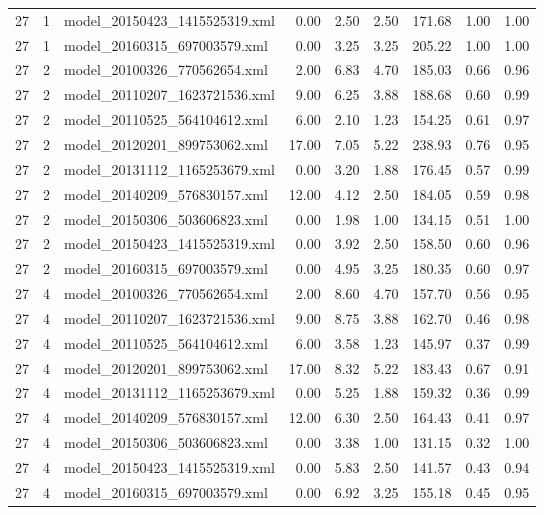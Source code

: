 \begin{table}[ht]
\begin{tabular}{rrlrrrrrr}
   27 &   1 & model\_20150423\_1415525319.xml & 0.00 & 2.50 & 2.50 & 171.68 & 1.00 & 1.00 \\ 
   27 &   1 & model\_20160315\_697003579.xml & 0.00 & 3.25 & 3.25 & 205.22 & 1.00 & 1.00 \\ 
   27 &   2 & model\_20100326\_770562654.xml & 2.00 & 6.83 & 4.70 & 185.03 & 0.66 & 0.96 \\ 
   27 &   2 & model\_20110207\_1623721536.xml & 9.00 & 6.25 & 3.88 & 188.68 & 0.60 & 0.99 \\ 
   27 &   2 & model\_20110525\_564104612.xml & 6.00 & 2.10 & 1.23 & 154.25 & 0.61 & 0.97 \\ 
   27 &   2 & model\_20120201\_899753062.xml & 17.00 & 7.05 & 5.22 & 238.93 & 0.76 & 0.95 \\ 
   27 &   2 & model\_20131112\_1165253679.xml & 0.00 & 3.20 & 1.88 & 176.45 & 0.57 & 0.99 \\ 
   27 &   2 & model\_20140209\_576830157.xml & 12.00 & 4.12 & 2.50 & 184.05 & 0.59 & 0.98 \\ 
   27 &   2 & model\_20150306\_503606823.xml & 0.00 & 1.98 & 1.00 & 134.15 & 0.51 & 1.00 \\ 
   27 &   2 & model\_20150423\_1415525319.xml & 0.00 & 3.92 & 2.50 & 158.50 & 0.60 & 0.96 \\ 
   27 &   2 & model\_20160315\_697003579.xml & 0.00 & 4.95 & 3.25 & 180.35 & 0.60 & 0.97 \\ 
   27 &   4 & model\_20100326\_770562654.xml & 2.00 & 8.60 & 4.70 & 157.70 & 0.56 & 0.95 \\ 
   27 &   4 & model\_20110207\_1623721536.xml & 9.00 & 8.75 & 3.88 & 162.70 & 0.46 & 0.98 \\ 
   27 &   4 & model\_20110525\_564104612.xml & 6.00 & 3.58 & 1.23 & 145.97 & 0.37 & 0.99 \\ 
   27 &   4 & model\_20120201\_899753062.xml & 17.00 & 8.32 & 5.22 & 183.43 & 0.67 & 0.91 \\ 
   27 &   4 & model\_20131112\_1165253679.xml & 0.00 & 5.25 & 1.88 & 159.32 & 0.36 & 0.99 \\ 
   27 &   4 & model\_20140209\_576830157.xml & 12.00 & 6.30 & 2.50 & 164.43 & 0.41 & 0.97 \\ 
   27 &   4 & model\_20150306\_503606823.xml & 0.00 & 3.38 & 1.00 & 131.15 & 0.32 & 1.00 \\ 
   27 &   4 & model\_20150423\_1415525319.xml & 0.00 & 5.83 & 2.50 & 141.57 & 0.43 & 0.94 \\ 
   27 &   4 & model\_20160315\_697003579.xml & 0.00 & 6.92 & 3.25 & 155.18 & 0.45 & 0.95 \\ 

\end{tabular}
\end{table}
